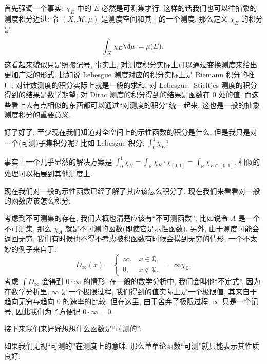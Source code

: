 首先强调一个事实: $\chi_E$ 中的 $E$ 必然是可测集才行. 这样的话我们也可以往抽象的测度积分迈进: 令 $(X,\mathcal M,\mu )$ 是测度空间和其上的一个测度, 那么定义 $\chi_E$ 的积分是
\[
    \int_X \chi_E \d \mu  \coloneqq  \mu (E)
    .\]
这看起来貌似只是照搬记号, 事实上, 对测度积分实际上可以通过变换测度来给出更加广泛的形式. 比如说 Lebesgue 测度对应的积分实际上是 Riemann 积分的推广; 对计数测度的积分实际上就是一般的求和; 对 Lebesgue\,--\,Stieltjes 测度的积分得到的结果是数学期望; 对 Dirac 测度的积分得到的结果是函数在 $0$ 处的值. 而这些看上去有点相似的东西都可以通过``对测度的积分''统一起来. 这也是一般的抽象测度积分的重要意义.

好了好了, 至少现在我们知道对全空间上的示性函数的积分是什么, 但是我只是对一个(可测)子集积分呢? 比如 Lebesgue 积分: $\int_0^1 \chi_E$?

事实上一个几乎显然的解决方案是 $\int_0^1 \chi_E=\int_{\mathbb R}\chi_E\cdot \chi_{[0,1]}=\int_{\mathbb R}\chi_{E\cap[0,1]}$. 相似的处理可以拓展到其他测度上.

现在我们对一般的示性函数已经了解了其应该怎么积分了, 现在我们来看看对一般的函数应该怎么积分.

考虑到不可测集的存在, 我们大概也清楚应该有``不可测函数'', 比如说令 $A$ 是一个不可测集, 那么 $\chi_A$ 就是不可测的函数(即使它是示性函数). 另外, 由于测度可能会返回无穷, 我们有时候也不得不考虑被积函数有时候会摸到无穷的情形, 一个不太妙的例子来自于:
\[
    D_\infty(x) = \begin{cases}
        \infty, & x\in \mathbb Q,    \\
        0,      & x\notin \mathbb Q.
    \end{cases} \ = \infty\chi_{\mathbb Q}.
\]
考虑 $\int D_\infty$ 会得到 $0\cdot \infty$ 的情形. 在一般的数学分析中, 我们会叫他``不定式''. 因为在数学分析里, $\infty$ 是一个极限过程, 我们得到的值实际上是一个极限值, 其来自于趋向无穷与趋向 $0$ 的速率的比较. 但在这里, 由于舍弃了极限过程, $\infty$ 只是一个记号, 因此我们为了方便记 $0\cdot \infty = 0$\enote.

接下来我们来好好想想什么函数是``可测的''.

如果我们无视``可测的''在测度上的意味, 那么单单论函数``可测''就只能表示其性质良好\enote.

